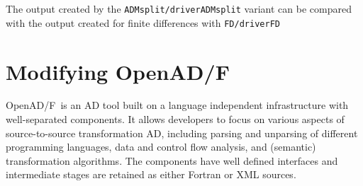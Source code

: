 \documentclass{book}
\newcommand{\OpenADF}{OpenAD/F}
\begin{document}
The output created  by the \lstinline{ADMsplit/driverADMsplit} variant can be compared with the output created for finite differences with 
\lstinline{FD/driverFD}
\chapter{Modifying \OpenADF}\label{sec:mods}

\OpenADF\ is an AD tool built on a language independent infrastructure with 
well-separated components. 
It 
allows developers to focus on various aspects of source-to-source 
transformation AD, including parsing and unparsing of different programming
languages, data and control flow analysis, and (semantic) transformation 
algorithms.
The components have well defined interfaces and intermediate stages 
are retained as either Fortran or XML sources. 
 
\end{document}

